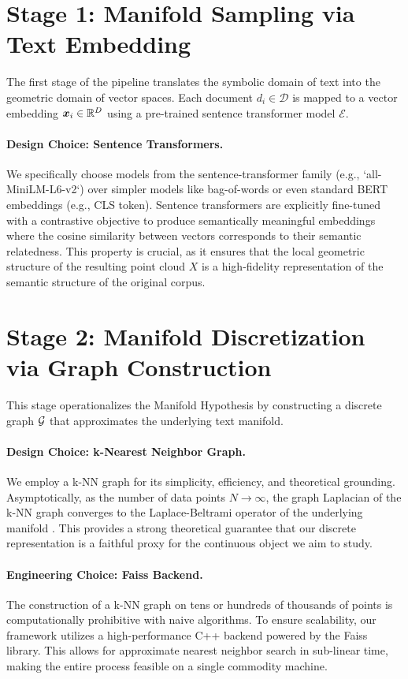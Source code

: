 \section{Stage 1: Manifold Sampling via Text Embedding}
The first stage of the pipeline translates the symbolic domain of text into the geometric domain of vector spaces. Each document $d_i \in \mathcal{D}$ is mapped to a vector embedding $\bm{x}_i \in \mathbb{R}^D$ using a pre-trained sentence transformer model $\mathcal{E}$.

\paragraph{Design Choice: Sentence Transformers.} We specifically choose models from the sentence-transformer family (e.g., `all-MiniLM-L6-v2`) over simpler models like bag-of-words or even standard BERT embeddings (e.g., CLS token). Sentence transformers are explicitly fine-tuned with a contrastive objective to produce semantically meaningful embeddings where the cosine similarity between vectors corresponds to their semantic relatedness. This property is crucial, as it ensures that the local geometric structure of the resulting point cloud $X$ is a high-fidelity representation of the semantic structure of the original corpus.

\section{Stage 2: Manifold Discretization via Graph Construction}
This stage operationalizes the Manifold Hypothesis by constructing a discrete graph $\mathcal{G}$ that approximates the underlying text manifold.

\paragraph{Design Choice: k-Nearest Neighbor Graph.} We employ a k-NN graph for its simplicity, efficiency, and theoretical grounding. Asymptotically, as the number of data points $N \to \infty$, the graph Laplacian of the k-NN graph converges to the Laplace-Beltrami operator of the underlying manifold \citep{belkin2003laplacian}. This provides a strong theoretical guarantee that our discrete representation is a faithful proxy for the continuous object we aim to study.

\paragraph{Engineering Choice: Faiss Backend.} The construction of a k-NN graph on tens or hundreds of thousands of points is computationally prohibitive with naive algorithms. To ensure scalability, our framework utilizes a high-performance C++ backend powered by the Faiss library. This allows for approximate nearest neighbor search in sub-linear time, making the entire process feasible on a single commodity machine.

